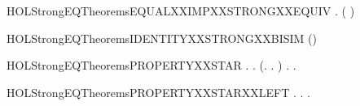 \begin{SaveVerbatim}{HOLStrongEQTheoremsEQUALXXIMPXXSTRONGXXEQUIV}
\HOLTokenTurnstile{} \HOLSymConst{\HOLTokenForall{}} . ( \HOLSymConst{=} ) \HOLSymConst{\HOLTokenImp{}}   
\end{SaveVerbatim}
\newcommand{\HOLStrongEQTheoremsEQUALXXIMPXXSTRONGXXEQUIV}{\UseVerbatim{HOLStrongEQTheoremsEQUALXXIMPXXSTRONGXXEQUIV}}
\begin{SaveVerbatim}{HOLStrongEQTheoremsIDENTITYXXSTRONGXXBISIM}
\HOLTokenTurnstile{}  (\HOLSymConst{=})
\end{SaveVerbatim}
\newcommand{\HOLStrongEQTheoremsIDENTITYXXSTRONGXXBISIM}{\UseVerbatim{HOLStrongEQTheoremsIDENTITYXXSTRONGXXBISIM}}
\begin{SaveVerbatim}{HOLStrongEQTheoremsPROPERTYXXSTAR}
\HOLTokenTurnstile{} \HOLSymConst{\HOLTokenForall{}} .
          \HOLSymConst{\HOLTokenEquiv{}}
       \HOLSymConst{\HOLTokenForall{}}.
           (\HOLSymConst{\HOLTokenForall{}}.  \HOLTokenTransBegin{}\HOLTokenTransEnd {} \HOLSymConst{\HOLTokenImp{}} \HOLSymConst{\HOLTokenExists{}}.  \HOLTokenTransBegin{}\HOLTokenTransEnd {} \HOLSymConst{\HOLTokenConj{}}   ) \HOLSymConst{\HOLTokenConj{}}
           \HOLSymConst{\HOLTokenForall{}}.  \HOLTokenTransBegin{}\HOLTokenTransEnd {} \HOLSymConst{\HOLTokenImp{}} \HOLSymConst{\HOLTokenExists{}}.  \HOLTokenTransBegin{}\HOLTokenTransEnd {} \HOLSymConst{\HOLTokenConj{}}   
\end{SaveVerbatim}
\newcommand{\HOLStrongEQTheoremsPROPERTYXXSTAR}{\UseVerbatim{HOLStrongEQTheoremsPROPERTYXXSTAR}}
\begin{SaveVerbatim}{HOLStrongEQTheoremsPROPERTYXXSTARXXLEFT}
\HOLTokenTurnstile{} \HOLSymConst{\HOLTokenForall{}} .
          \HOLSymConst{\HOLTokenImp{}}
       \HOLSymConst{\HOLTokenForall{}} .  \HOLTokenTransBegin{}\HOLTokenTransEnd {} \HOLSymConst{\HOLTokenImp{}} \HOLSymConst{\HOLTokenExists{}}.  \HOLTokenTransBegin{}\HOLTokenTransEnd {} \HOLSymConst{\HOLTokenConj{}}   
\end{SaveVerbatim}
